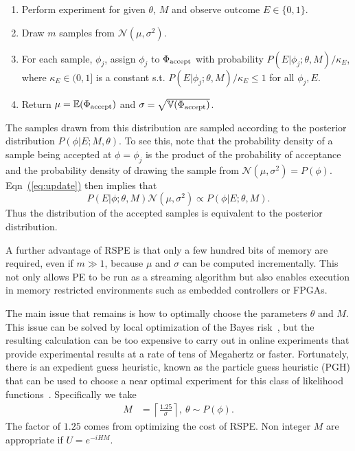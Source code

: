 \documentclass[aps,pra,amsmath,twocolumn,amssymb,superscriptaddress]{revtex4-1}
\newcommand{\eq}[1]{\hyperref[eq:#1]{(\ref*{eq:#1})}}
\begin{document}
\begin{enumerate}
\item Perform experiment for given $\theta$, $M$ and observe outcome $E\in \{0,1\}$.
\item Draw $m$ samples from $\mathcal{N}(\mu,\sigma^2)$.
\item For each sample, $\phi_j$, assign $\phi_j$ to $\Phi_{\rm accept}$ with probability $P(E|\phi_j;\theta,M)/\kappa_E$, where $\kappa_E\in (0,1]$ is a constant s.t. $P(E|\phi_j;\theta,M)/\kappa_E\le 1$ for all $\phi_j,E$.
\item Return $\mu = \mathbb{E}(\Phi_{\rm accept})$ and $\sigma =\sqrt{\mathbb{V}(\Phi_{\rm accept})}$.
\end{enumerate}

The samples drawn from this distribution are sampled according to the posterior distribution
$P(\phi|E;M,\theta)$.  To see this, note that the probability density of a sample being accepted at $\phi=\phi_j$ is the product of the probability of acceptance and the probability density of drawing the sample from $\mathcal{N}(\mu,\sigma^2)=P(\phi)$.  Eqn~\eq{update} then implies that
\begin{equation}
    P(E | \phi; \theta, M) \mathcal{N}(\mu,\sigma^2) \propto P(\phi | E; \theta, M).
\end{equation}
Thus the distribution of the accepted samples is equivalent to the posterior distribution.  

A further advantage of RSPE is that only a few hundred bits of memory are required, even if $m\gg 1$, because $\mu$ and $\sigma$ can be computed incrementally.  This not only allows PE to be run as a streaming algorithm but also enables execution in memory restricted environments such as embedded controllers or FPGAs.


The main issue that remains is how to optimally choose the parameters $\theta$ and $M$.
This issue can be solved by local optimization of the Bayes risk~\cite{granade_robust_2012}, but the resulting calculation can be too expensive to carry out in online experiments that provide experimental results at a rate of tens of Megahertz or faster.  Fortunately, there is an expedient guess heuristic, known as the particle guess heuristic (PGH) that can be used to choose a near optimal experiment for this class of likelihood functions~\cite{wiebe_hamiltonian_2014}.  Specifically we take
\begin{align}
M &= \left\lceil\frac{1.25}{\sigma}\right\rceil,~
\theta \sim P(\phi).\label{eq:PGH}
\end{align}
The factor of $1.25$ comes from optimizing the cost of RSPE.  
Non integer $M$ are appropriate if $U=e^{-i H M}$.
\end{document}
